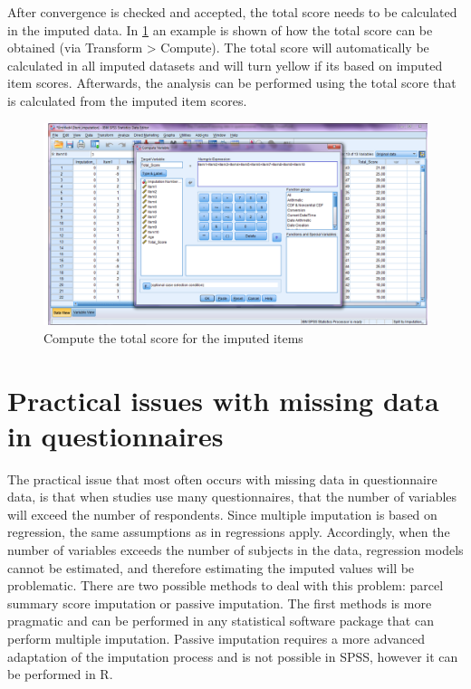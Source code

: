 \documentclass[
]{book}
\begin{document}
After convergence is checked and accepted, the total score needs to be calculated in the imputed data. In \ref{fig:fig8-6} an example is shown of how the total score can be obtained (via Transform \textgreater{} Compute). The total score will automatically be calculated in all imputed datasets and will turn yellow if its based on imputed item scores. Afterwards, the analysis can be performed using the total score that is calculated from the imputed item scores.

\begin{figure}

{\centering \includegraphics[width=0.9\linewidth]{images/fig8.6} 

}

\caption{Compute the total score for the imputed items}\label{fig:fig8-6}
\end{figure}

\hypertarget{practical-issues-with-missing-data-in-questionnaires}{%
\section{Practical issues with missing data in questionnaires}\label{practical-issues-with-missing-data-in-questionnaires}}

The practical issue that most often occurs with missing data in questionnaire data, is that when studies use many questionnaires, that the number of variables will exceed the number of respondents. Since multiple imputation is based on regression, the same assumptions as in regressions apply. Accordingly, when the number of variables exceeds the number of subjects in the data, regression models cannot be estimated, and therefore estimating the imputed values will be problematic.
There are two possible methods to deal with this problem: parcel summary score imputation or passive imputation. The first methods is more pragmatic and can be performed in any statistical software package that can perform multiple imputation. Passive imputation requires a more advanced adaptation of the imputation process and is not possible in SPSS, however it can be performed in R.
\end{document}
